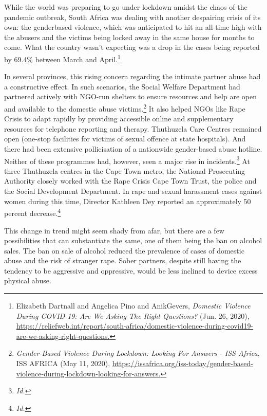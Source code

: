 \begin{multicols}{2}

\noi
While the world was preparing to go under lockdown amidst the chaos of the pandemic
outbreak, South Africa was dealing with another despairing crisis of its own: the genderbased violence, which was anticipated to hit an all-time high with the abusers and the victims being locked away in the same house for months to come. What the country wasn’t expecting
was a drop in the cases being reported by 69.4\% between March and April.\footnote{Elizabeth Dartnall and Angelica Pino and AnikGevers, \textit{Domestic Violence During COVID-19: Are We Asking
The Right Questions?} (Jun. 26, 2020), \url{https://reliefweb.int/report/south-africa/domestic-violence-during-covid19-are-we-asking-right-questions.}}

\noi
In several provinces, this rising concern regarding the intimate partner abuse had a
constructive effect. In such scenarios, the Social Welfare Department had partnered actively
with NGO-run shelters to ensure resources and help are open and available to the domestic
abuse victims.\footnote{\textit{Gender-Based Violence During Lockdown: Looking For Answers - ISS Africa}, ISS AFRICA (May 11, 2020),
\url{https://issafrica.org/iss-today/gender-based-violence-during-lockdown-looking-for-answers.}} It also helped NGOs like Rape Crisis to adapt rapidly by providing accessible
online and supplementary resources for telephone reporting and therapy. Thuthuzela Care
Centres remained open (one-stop facilities for victims of sexual offence at state hospitals).
And there had been extensive pollicisation of a nationwide gender-based abuse hotline.
Neither of these programmes had, however, seen a major rise in incidents.\footnote{\textit{Id.}} At three
Thuthuzela centres in the Cape Town metro, the National Prosecuting Authority closely
worked with the Rape Crisis Cape Town Trust, the police and the Social Development
Department. In rape and sexual harassment cases against women during this time, Director
Kathleen Dey reported an approximately 50 percent decrease.\footnote{\textit{Id.}}

\noi
This change in trend might seem shady from afar, but there are a few possibilities that can
substantiate the same, one of them being the ban on alcohol sales. The ban on sale of alcohol
reduced the prevalence of cases of domestic abuse and the risk of stranger rape. Sober
partners, despite still having the tendency to be aggressive and oppressive, would be less
inclined to device excess physical abuse.


\end{multicols}
